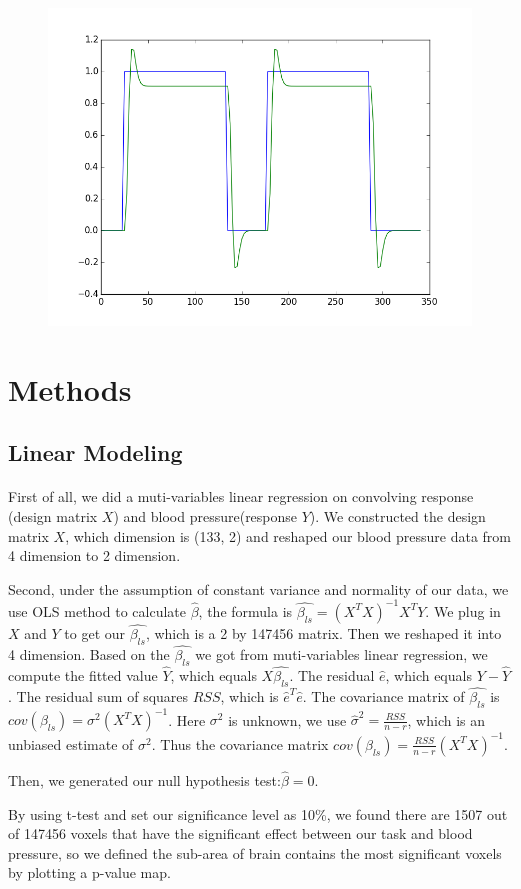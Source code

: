 \documentclass[11pt]{article}
\begin{document}
\begin{figure}
    \includegraphics[width=\linewidth]{task001_run001_conv005}
\end{figure}

\section{Methods}
\subsection{Linear Modeling}
\paragraph{}
First of all, we did a muti-variables linear regression on convolving response 
(design matrix $X$) and blood pressure(response $Y$). We constructed the design 
matrix $X$, which dimension is (133, 2) and reshaped our blood pressure data from 
4 dimension to 2 dimension.\par
Second, under the assumption of constant variance and normality of our data, we 
use OLS method to calculate $\hat{\beta}$, the formula is 
$\hat{\beta_{ls}}=(X^{T}X)^{-1}X^{T}Y$. We plug in $X$ and $Y$ to get
our $\hat{\beta_{ls}}$, which is a 2 by 147456 matrix. Then we reshaped it into 
4 dimension. Based on the $\hat{\beta_{ls}}$ we got from muti-variables linear 
regression, we compute the fitted value $\hat{Y}$, which equals 
$X\hat{\beta_{ls}}$. The residual $\hat{e}$, which equals $Y-\hat{Y}$. The 
residual sum of squares $RSS$, which is $\hat{e}^{T}\hat{e}$. The covariance
matrix of $\hat{\beta_{ls}}$ is $cov(\beta_{ls}) = \sigma^2(X^{T}X)^{-1}$. Here $\sigma^2$
is unknown, we use $\hat{\sigma}^2 = \frac{RSS}{n-r}$, which is an unbiased 
estimate of $\sigma^2$. Thus the covariance matrix 
$cov(\beta_{ls}) = \frac{RSS}{n-r}(X^{T}X)^{-1}$. \par
Then, we generated our null hypothesis test:$\hat{\beta} = 0$.\par
By using t-test and set our significance level as 10\%, we found there are 1507 
out of 147456 voxels that have the significant effect between our task and 
blood pressure, so we defined the sub-area of brain contains the most 
significant voxels by plotting a p-value map.
\end{document}
